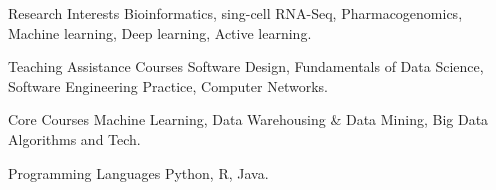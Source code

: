 
\begin{cvskills}
\cvskill
{Research Interests} %
{Bioinformatics, sing-cell RNA-Seq, Pharmacogenomics, Machine learning, Deep learning, Active learning.} %

\cvskill
{Teaching Assistance Courses} %
{Software Design, Fundamentals of Data Science, Software Engineering Practice, Computer Networks.} %

\cvskill
{Core Courses} %
{Machine Learning, Data Warehousing \& Data Mining, Big Data Algorithms and Tech.} %

\cvskill
{Programming Languages} %
{Python, R, Java.} %
\end{cvskills}
